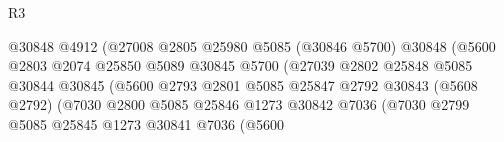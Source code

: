 \begin{lexlean}{R3}
\begin{coremodule}
                                              @30848
                                              @4912
                                              (@27008
                                                @2805
                                                @25980
                                                @5085
                                                (@30846 @5700)
                                                @30848
                                                (@5600
                                                  @2803
                                                  @2074
                                                  @25850
                                                  @5089
                                                  @30845
                                                  @5700
                                                  (@27039
                                                    @2802
                                                    @25848
                                                    @5085
                                                    @30844
                                                    @30845
                                                    (@5600
                                                      @2793
                                                      @2801
                                                      @5085
                                                      @25847
                                                      @2792
                                                      @30843
                                                      (@5608 @2792)
                                                      (@7030
                                                        @2800
                                                        @5085
                                                        @25846
                                                        @1273
                                                        @30842
                                                        @7036
                                                        (@7030
                                                          @2799
                                                          @5085
                                                          @25845
                                                          @1273
                                                          @30841
                                                          @7036
                                                          (@5600

\end{coremodule}
\end{lexlean}
